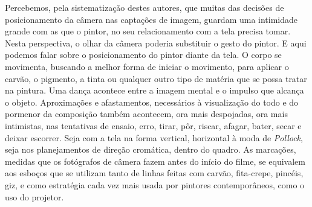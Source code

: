 Percebemos, pela sistematização destes autores, que muitas das decisões
de posicionamento da câmera nas captações de imagem, guardam uma
intimidade grande com as que o pintor, no seu relacionamento com a tela
precisa tomar. Nesta perspectiva, o olhar da câmera poderia substituir
o gesto do pintor. E aqui podemos falar sobre o posicionamento do
pintor diante da tela. O corpo se movimenta, buscando a melhor forma de
iniciar o movimento, para aplicar o carvão, o pigmento, a tinta ou
qualquer outro tipo de matéria que se possa tratar na pintura. Uma
dança acontece entre a imagem mental e o impulso que alcança o objeto.
Aproximações e afastamentos, necessários à visualização do todo e do
pormenor da composição também acontecem, ora mais despojadas, ora mais
intimistas, nas tentativas de ensaio, erro, tirar, pôr, riscar, afagar,
bater, secar e deixar escorrer. Seja com a tela na forma vertical,
horizontal à moda de \emph{Pollock}, seja nos planejamentos de direção
cromática, dentro do quadro. As marcações, medidas que os fotógrafos de
câmera fazem antes do início do filme, se equivalem aos esboços que se
utilizam tanto de linhas feitas com carvão, fita-crepe, pincéis, giz, e
como estratégia cada vez mais usada por pintores contemporâneos, como o
uso do projetor.

